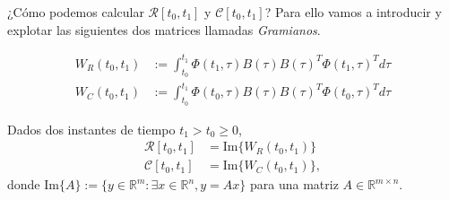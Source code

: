 ¿Cómo podemos calcular $\mathcal{R}[t_0,t_1]$ y $\mathcal{C}[t_0,t_1]$? Para ello vamos a introducir y explotar las siguientes dos matrices llamadas \emph{Gramianos}.

\begin{definition}
	\begin{align}
		W_R(t_0,t_1) &:= \int_{t_0}^{t_1} \Phi(t_1,\tau)B(\tau)B(\tau)^T\Phi(t_1,\tau)^Td\tau \\
		W_C(t_0,t_1) &:= \int_{t_0}^{t_1} \Phi(t_0,\tau)B(\tau)B(\tau)^T\Phi(t_0,\tau)^Td\tau 
	\end{align}
\end{definition}

\begin{theorem}
Dados dos instantes de tiempo $t_1 > t_0 \geq 0$,
	\begin{align}
		\mathcal{R}[t_0,t_1] &= \text{Im}\{W_R(t_0,t_1)\} \label{RI} \\
		\mathcal{C}[t_0,t_1] &= \text{Im}\{W_C(t_0,t_1)\} \label{CI},
	\end{align}
	donde $\text{Im}\{A\}:= \Big\{y\in\mathbb{R}^m: \exists x\in\mathbb{R}^n, y = Ax\Big\}$ para una matriz $A\in\mathbb{R}^{m\times n}$.
\end{theorem}
